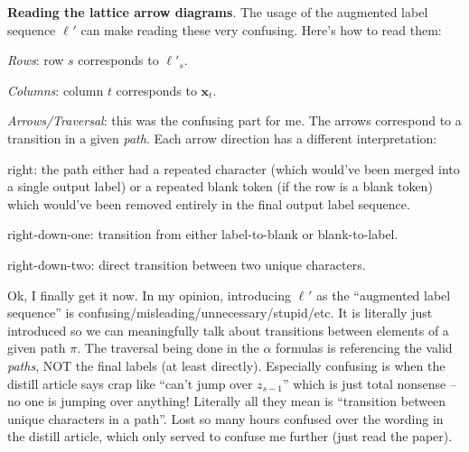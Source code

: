 \documentclass[11pt]{article}
\renewcommand\vec[2][]{\bm{#2}_{#1}}
\begin{document}
\textbf{Reading the lattice arrow diagrams}. The usage of the augmented label sequence $\vec{\ell}'$ can make reading these very confusing. Here's how to read them:
\begin{compactitem}
	\item \textit{Rows}: row $s$ corresponds to $\ell'_s$. 
	\item \textit{Columns}: column $t$ corresponds to $\vec[t]{x}$. 
	\item \textit{Arrows/Traversal}: this was the confusing part for me. The arrows correspond to a transition in a given \textit{path}. Each arrow direction has a different interpretation:
	\begin{compactitem}
		\item right: the path either had a repeated character (which would've been merged into a single output label) or a repeated blank token (if the row is a blank token) which would've been removed entirely in the final output label sequence. 
		\item right-down-one: transition from either label-to-blank or blank-to-label. 
		\item right-down-two: direct transition between two unique characters. 
	\end{compactitem}
\end{compactitem}

Ok, I finally get it now. In my opinion, introducing $\vec{\ell}'$ as the ``augmented label sequence'' is confusing/misleading/unnecessary/stupid/etc. It is literally just introduced so we can meaningfully talk about transitions between elements of a given path $\pi$. The traversal being done in the $\alpha$ formulas is referencing the valid \textit{paths}, NOT the final labels (at least directly). Especially confusing is when the distill article says crap like ``can't jump over $z_{s-1}$'' which is just total nonsense -- no one is jumping over anything! Literally all they mean is ``transition between unique characters in a path''. Lost so many hours confused over the wording in the distill article, which only served to confuse me further (just read the paper).  
	 
\end{document}
